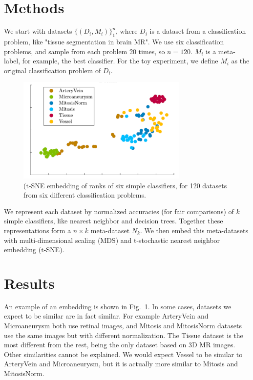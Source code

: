 \documentclass{llncs}
\begin{document}
  


\section{Methods}\label{sec:methods} 

We start with datasets $\{(D_i, M_i)\}_{1}^{n}$, where $D_i$ is a dataset from a classification problem, like "tissue segmentation in brain MR". We use six classification problems, and sample from each problem 20 times, so $n=120$. $M_i$ is a meta-label, for example, the best classifier. For the toy experiment, we define $M_i$ as the original classification problem of $D_i$. 

\begin{figure}
\centering
\includegraphics[width=0.75\textwidth]{tsne_rank.png}%
\caption{(t-SNE embedding of ranks of six simple classifiers, for 120 datasets from six different classification problems.}
\label{fig:overview}
\end{figure}

We represent each dataset by normalized accuracies (for fair comparisons) of $k$ simple classifiers, like nearest neighbor and decision trees.  Together these representations form a $n \times k$ meta-dataset $N_k$. We then embed this meta-datasets with  multi-dimensional scaling (MDS) and t-stochastic nearest neighbor embedding (t-SNE). 






\section{Results}\label{sec:results}

An example of an embedding is shown in Fig.~\ref{fig:overview}. In some cases, datasets we expect to be similar are in fact similar. For example ArteryVein and Microaneurysm both use retinal images, and Mitosis and MitosisNorm datasets use the same images but with different normalization. The Tissue dataset is the most different from the rest, being the only dataset based on 3D MR images. Other similarities cannot be explained. We would expect Vessel to be similar to ArteryVein and Microaneurysm, but it is actually more similar to Mitosis and MitosisNorm. 
\end{document}
